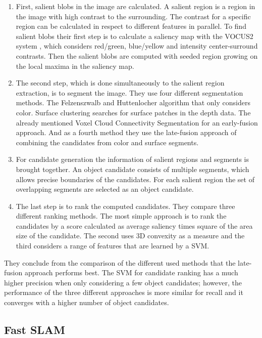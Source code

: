 \documentclass[a4paper,11pt,english]{article}
\begin{document}
\begin{enumerate}
	\item First, salient blobs in the image are calculated.
	A salient region is a region in the image with high contrast to the surrounding.
	The contrast for a specific region can be calculated in respect to different features in parallel.
	To find salient blobs their first step is to calculate a saliency map with the VOCUS2 system \cite{frintrop2015traditional}, which considers red/green, blue/yellow and intensity center-surround contrasts.
	Then the salient blobs are computed with seeded region growing on the local maxima in the saliency map.
	\item The second step, which is done simultaneously to the salient region extraction, is to segment the image.
	They use four different segmentation methods. The Felzenszwalb and Huttenlocher algorithm \cite{felzenszwalb2004efficient} that only considers color. Surface clustering searches for surface patches in the depth data. The already mentioned Voxel Cloud Connectivity Segmentation for an early-fusion approach. And as a fourth method they use the late-fusion approach of combining the candidates from color and surface segments.
	\item For candidate generation the information of salient regions and segments is brought together.
	An object candidate consists of multiple segments, which allows precise boundaries of the candidates.
	For each salient region the set of overlapping segments are selected as an object candidate.
	\item The last step is to rank the computed candidates. They compare three different ranking methods.
	The most simple approach is to rank the candidates by a score calculated as average saliency times square of the area size of the candidate.
	The second uses 3D convexity as a measure and the third considers a range of features that are learned by a SVM.
\end{enumerate}

They conclude from the comparison of the different used methods that the late-fusion approach performs best.
The SVM for candidate ranking has a much higher precision when only considering a few object candidates; however, the performance of the three different approaches is more similar for recall and it converges with a higher number of object candidates.

\subsection{Fast SLAM}
\label{background:slam}
\end{document}
